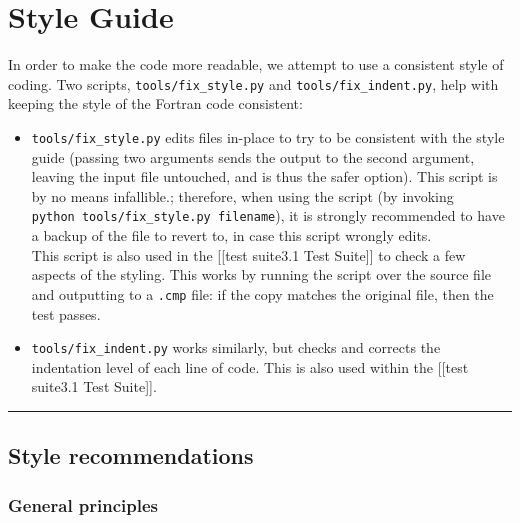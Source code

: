 \section{Style Guide} \label{sec:style}

In order to make the code more readable, we attempt to use a consistent
style of coding. Two scripts, \texttt{tools/fix\_style.py} and
\texttt{tools/fix\_indent.py}, help with keeping the style of the
Fortran code consistent:

\begin{itemize}
\item
  \texttt{tools/fix\_style.py} edits files in-place to try to be
  consistent with the style guide (passing two arguments sends the
  output to the second argument, leaving the input file untouched, and
  is thus the safer option). This script is by no means infallible.;
  therefore, when using the script (by invoking
  \texttt{python\ tools/fix\_style.py\ filename}), it is strongly
  recommended to have a backup of the file to revert to, in case this
  script wrongly edits.\\
  This script is also used in the {[}{[}test suite\textbar{}3.1 Test
  Suite{]}{]} to check a few aspects of the styling. This works by
  running the script over the source file and outputting to a
  \texttt{.cmp} file: if the copy matches the original file, then the
  test passes.
\item
  \texttt{tools/fix\_indent.py} works similarly, but checks and corrects
  the indentation level of each line of code. This is also used within
  the {[}{[}test suite\textbar{}3.1 Test Suite{]}{]}.
\end{itemize}

\begin{center}\rule{0.5\linewidth}{\linethickness}\end{center}

\subsection{Style recommendations}\label{style-recommendations}

\subsubsection{General principles}\label{general-principles}

